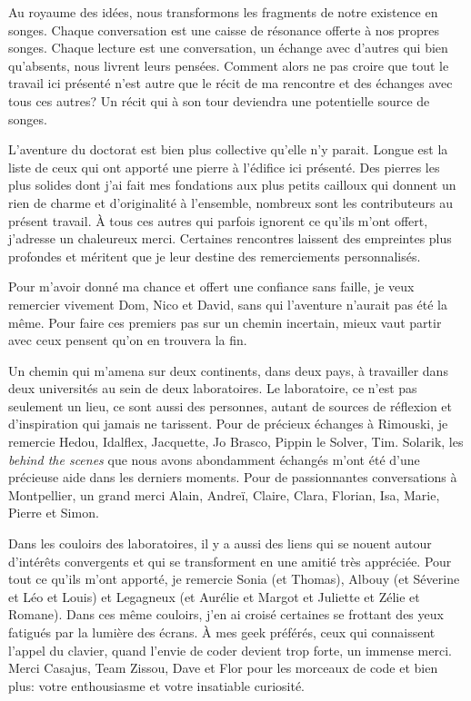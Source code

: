 Au royaume des idées, nous transformons les fragments de notre existence
en songes. Chaque conversation est une caisse de résonance offerte à nos
propres songes. Chaque lecture est une conversation, un échange avec
d'autres qui bien qu'absents, nous livrent leurs pensées. Comment alors
ne pas croire que tout le travail ici présenté n'est autre que le récit
de ma rencontre et des échanges avec tous ces autres? Un récit qui à son
tour deviendra une potentielle source de songes.

L'aventure du doctorat est bien plus collective qu'elle n'y parait.
Longue est la liste de ceux qui ont apporté une pierre à l'édifice ici
présenté. Des pierres les plus solides dont j'ai fait mes fondations aux
plus petits cailloux qui donnent un rien de charme et d'originalité à
l'ensemble, nombreux sont les contributeurs au présent travail. À tous
ces autres qui parfois ignorent ce qu'ils m'ont offert, j'adresse un
chaleureux merci. Certaines rencontres laissent des empreintes plus
profondes et méritent que je leur destine des remerciements
personnalisés.

Pour m'avoir donné ma chance et offert une confiance sans faille, je
veux remercier vivement Dom, Nico et David, sans qui l'aventure n'aurait
pas été la même. Pour faire ces premiers pas sur un chemin incertain,
mieux vaut partir avec ceux pensent qu'on en trouvera la fin.

Un chemin qui m'amena sur deux continents, dans deux pays, à travailler
dans deux universités au sein de deux laboratoires. Le laboratoire, ce
n'est pas seulement un lieu, ce sont aussi des personnes, autant de
sources de réflexion et d'inspiration qui jamais ne tarissent. Pour de
précieux échanges à Rimouski, je remercie Hedou, Idalflex, Jacquette, Jo
Brasco, Pippin le Solver, Tim. Solarik, les \emph{behind the scenes} que
nous avons abondamment échangés m'ont été d'une précieuse aide dans les
derniers moments. Pour de passionnantes conversations à Montpellier, un
grand merci Alain, Andreï, Claire, Clara, Florian, Isa, Marie, Pierre et
Simon.

Dans les couloirs des laboratoires, il y a aussi des liens qui se nouent
autour d'intérêts convergents et qui se transforment en une amitié très
appréciée. Pour tout ce qu'ils m'ont apporté, je remercie Sonia (et
Thomas), Albouy (et Séverine et Léo et Louis) et Legagneux (et Aurélie
et Margot et Juliette et Zélie et Romane). Dans ces même couloirs, j'en
ai croisé certaines se frottant des yeux fatigués par la lumière des
écrans. À mes geek préférés, ceux qui connaissent l'appel du clavier,
quand l'envie de coder devient trop forte, un immense merci. Merci
Casajus, Team Zissou, Dave et Flor pour les morceaux de code et bien
plus: votre enthousiasme et votre insatiable curiosité.

